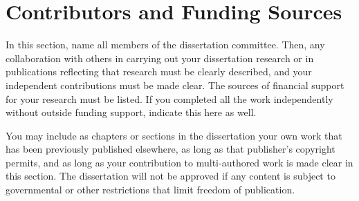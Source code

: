 \documentclass[\main/master.tex]{subfiles}
\begin{document}
\chapter*{Contributors and Funding Sources}
In this section, name all members of the dissertation committee. Then, any collaboration with others in 
carrying out your dissertation research or in publications reflecting that research must be clearly described,
and your independent contributions must be made clear. The sources of financial support for your research 
must be listed. If you completed all the work independently without outside funding support, indicate this
here as well. \par
You may include as chapters or sections in the dissertation your own work that has been previously published
elsewhere, as long as that publisher’s copyright permits, and as long as your contribution to multi-authored
work is made clear in this section. The dissertation will not be approved if any content is subject to
governmental or other restrictions that limit freedom of publication.
\end{document}
